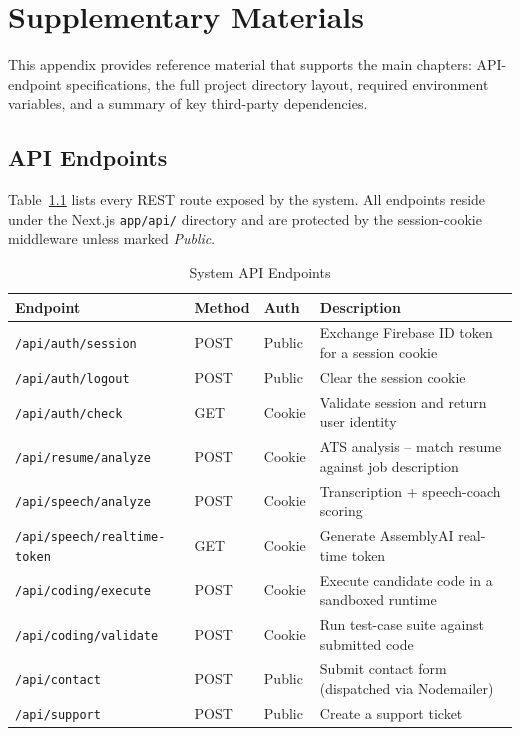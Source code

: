 
\chapter{Supplementary Materials}
\label{app:supplementary}

This appendix provides reference material that supports the main chapters:
API-endpoint specifications, the full project directory layout, required
environment variables, and a summary of key third-party dependencies.

\section{API Endpoints}
\label{app:api}

Table~\ref{tab:api_endpoints} lists every REST route exposed by the system.
All endpoints reside under the Next.js \texttt{app/api/} directory and are
protected by the session-cookie middleware unless marked \emph{Public}.

\begin{table}[H]
\centering
\caption{System API Endpoints}
\label{tab:api_endpoints}
\begin{tabular}{|p{4.2cm}|p{1.6cm}|p{1.5cm}|p{6cm}|}
\hline
\textbf{Endpoint} & \textbf{Method} & \textbf{Auth} & \textbf{Description} \\
\hline
\texttt{/api/auth/session}       & POST & Public  & Exchange Firebase ID token for a session cookie \\
\hline
\texttt{/api/auth/logout}        & POST & Public  & Clear the session cookie \\
\hline
\texttt{/api/auth/check}         & GET  & Cookie  & Validate session and return user identity \\
\hline
\texttt{/api/resume/analyze}     & POST & Cookie  & ATS analysis -- match resume against job description \\
\hline
\texttt{/api/speech/analyze}     & POST & Cookie  & Transcription + speech-coach scoring \\
\hline
\texttt{/api/speech/realtime-token} & GET & Cookie & Generate AssemblyAI real-time token \\
\hline
\texttt{/api/coding/execute}     & POST & Cookie  & Execute candidate code in a sandboxed runtime \\
\hline
\texttt{/api/coding/validate}    & POST & Cookie  & Run test-case suite against submitted code \\
\hline
\texttt{/api/contact}            & POST & Public  & Submit contact form (dispatched via Nodemailer) \\
\hline
\texttt{/api/support}            & POST & Public  & Create a support ticket \\
\hline
\end{tabular}
\end{table}

